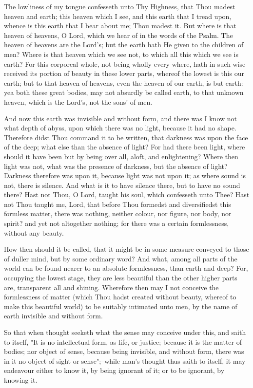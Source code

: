\documentclass[b5paper,openright,12pt,twoside]{book}
\begin{document}
The lowliness of my tongue confesseth unto Thy Highness, that Thou
madest heaven and earth; this heaven which I see, and this earth that I
tread upon, whence is this earth that I bear about me; Thou madest it.
But where is that heaven of heavens, O Lord, which we hear of in the
words of the Psalm. The heaven of heavens are the Lord's; but the earth
hath He given to the children of men? Where is that heaven which we see
not, to which all this which we see is earth? For this corporeal whole,
not being wholly every where, hath in such wise received its portion of
beauty in these lower parts, whereof the lowest is this our earth; but
to that heaven of heavens, even the heaven of our earth, is but earth:
yea both these great bodies, may not absurdly be called earth, to that
unknown heaven, which is the Lord's, not the sons' of men.

And now this earth was invisible and without form, and there was I know
not what depth of abyss, upon which there was no light, because it had
no shape. Therefore didst Thou command it to be written, that darkness
was upon the face of the deep; what else than the absence of light? For
had there been light, where should it have been but by being over all,
aloft, and enlightening? Where then light was not, what was the presence
of darkness, but the absence of light? Darkness therefore was upon it,
because light was not upon it; as where sound is not, there is silence.
And what is it to have silence there, but to have no sound there? Hast
not Thou, O Lord, taught his soul, which confesseth unto Thee? Hast not
Thou taught me, Lord, that before Thou formedst and diversifiedst this
formless matter, there was nothing, neither colour, nor figure, nor
body, nor spirit? and yet not altogether nothing; for there was a
certain formlessness, without any beauty.

How then should it be called, that it might be in some measure conveyed
to those of duller mind, but by some ordinary word? And what, among all
parts of the world can be found nearer to an absolute formlessness, than
earth and deep? For, occupying the lowest stage, they are less beautiful
than the other higher parts are, transparent all and shining. Wherefore
then may I not conceive the formlessness of matter (which Thou hadst
created without beauty, whereof to make this beautiful world) to be
suitably intimated unto men, by the name of earth invisible and without
form.

So that when thought seeketh what the sense may conceive under this,
and saith to itself, "It is no intellectual form, as life, or justice;
because it is the matter of bodies; nor object of sense, because being
invisible, and without form, there was in it no object of sight or
sense";--while man's thought thus saith to itself, it may endeavour
either to know it, by being ignorant of it; or to be ignorant, by
knowing it.
\end{document}
